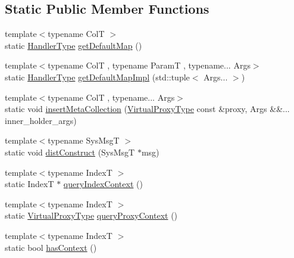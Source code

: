 \subsection*{Static Public Member Functions}
\begin{DoxyCompactItemize}
\item 
{\footnotesize template$<$typename ColT $>$ }\\static \hyperlink{namespacevt_af64846b57dfcaf104da3ef6967917573}{Handler\+Type} \hyperlink{structvt_1_1vrt_1_1collection_1_1_collection_manager_aa371f1cdd4eafa9f75b7eb40a6f151e0}{get\+Default\+Map} ()
\item 
{\footnotesize template$<$typename ColT , typename ParamT , typename... Args$>$ }\\static \hyperlink{namespacevt_af64846b57dfcaf104da3ef6967917573}{Handler\+Type} \hyperlink{structvt_1_1vrt_1_1collection_1_1_collection_manager_ae92ad81b99b380b0b87b85f7dbda767a}{get\+Default\+Map\+Impl} (std\+::tuple$<$ Args... $>$)
\item 
{\footnotesize template$<$typename ColT , typename... Args$>$ }\\static void \hyperlink{structvt_1_1vrt_1_1collection_1_1_collection_manager_a1220f88fee25f84133a271ff19762b62}{insert\+Meta\+Collection} (\hyperlink{namespacevt_a1b417dd5d684f045bb58a0ede70045ac}{Virtual\+Proxy\+Type} const \&proxy, Args \&\&... inner\+\_\+holder\+\_\+args)
\item 
{\footnotesize template$<$typename Sys\+MsgT $>$ }\\static void \hyperlink{structvt_1_1vrt_1_1collection_1_1_collection_manager_ab82abba567a08d19a26618fe7c65452e}{dist\+Construct} (Sys\+MsgT $\ast$msg)
\item 
{\footnotesize template$<$typename IndexT $>$ }\\static IndexT $\ast$ \hyperlink{structvt_1_1vrt_1_1collection_1_1_collection_manager_a5364a7039d323f3733b6ab1816cf61d4}{query\+Index\+Context} ()
\item 
{\footnotesize template$<$typename IndexT $>$ }\\static \hyperlink{namespacevt_a1b417dd5d684f045bb58a0ede70045ac}{Virtual\+Proxy\+Type} \hyperlink{structvt_1_1vrt_1_1collection_1_1_collection_manager_a77d8832834659c44badf499c4770777b}{query\+Proxy\+Context} ()
\item 
{\footnotesize template$<$typename IndexT $>$ }\\static bool \hyperlink{structvt_1_1vrt_1_1collection_1_1_collection_manager_ad94808d98e429e50376a9d1b35de57ee}{has\+Context} ()

\end{DoxyCompactItemize}
